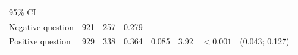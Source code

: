 \documentclass[11pt,a4paper,openany]{book}
\begin{document}
\begin{longtable}[]{@{}lrrrrrrr@{}}
\begin{minipage}[t]{0.07\columnwidth}
95\% CI\strut
\end{minipage}\tabularnewline
\begin{minipage}[t]{0.35\columnwidth}\raggedright\strut
Negative question\strut
\end{minipage} & \begin{minipage}[t]{0.05\columnwidth}\raggedleft\strut
921\strut
\end{minipage} & \begin{minipage}[t]{0.04\columnwidth}\raggedleft\strut
257\strut
\end{minipage} & \begin{minipage}[t]{0.06\columnwidth}\raggedleft\strut
0.279\strut
\end{minipage} & \begin{minipage}[t]{0.11\columnwidth}\raggedleft\strut
\strut
\end{minipage} & \begin{minipage}[t]{0.05\columnwidth}\raggedleft\strut
\strut
\end{minipage} & \begin{minipage}[t]{0.05\columnwidth}\raggedleft\strut
\strut
\end{minipage} & \begin{minipage}[t]{0.07\columnwidth}\raggedleft\strut
\strut
\end{minipage}\tabularnewline
\begin{minipage}[t]{0.35\columnwidth}\raggedright\strut
Positive question\strut
\end{minipage} & \begin{minipage}[t]{0.05\columnwidth}\raggedleft\strut
929\strut
\end{minipage} & \begin{minipage}[t]{0.04\columnwidth}\raggedleft\strut
338\strut
\end{minipage} & \begin{minipage}[t]{0.06\columnwidth}\raggedleft\strut
0.364\strut
\end{minipage} & \begin{minipage}[t]{0.11\columnwidth}\raggedleft\strut
0.085\strut
\end{minipage} & \begin{minipage}[t]{0.05\columnwidth}\raggedleft\strut
3.92\strut
\end{minipage} & \begin{minipage}[t]{0.05\columnwidth}\raggedleft\strut
\(<0.001\)\strut
\end{minipage} & \begin{minipage}[t]{0.07\columnwidth}\raggedleft\strut
(0.043; 0.127)\strut
\end{minipage}\tabularnewline
\bottomrule
\end{longtable}
\end{document}
